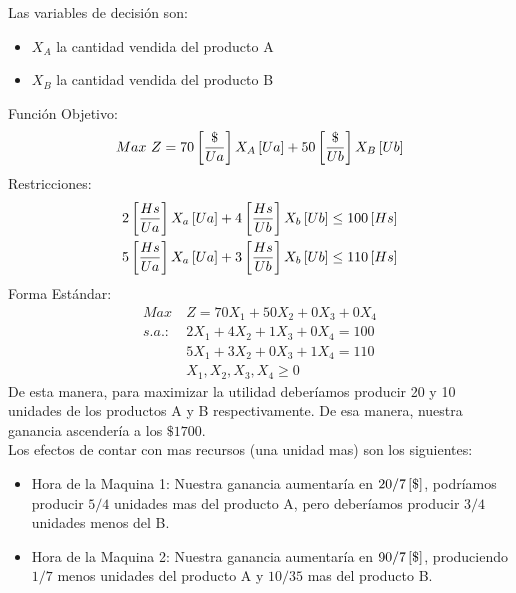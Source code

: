 \documentclass{tarea}
\begin{document}
\begin{homeworkProblem}[-1][Compañía]
Las variables de decisión son:
\begin{itemize}
	\item $X_A$ la cantidad vendida del producto A
	\item $X_B$ la cantidad vendida del producto B
\end{itemize}
Función Objetivo:
\begin{equation}
	Max\ Z = 70\left[ \frac{\$}{Ua} \right]X_A\left[ Ua \right] + 50\left[ \frac{\$}{Ub} \right]X_B\left[ Ub \right]
\end{equation}
Restricciones:
\begin{align*}
  2\left[ \frac{Hs}{Ua} \right]X_a\left[ Ua \right] + 4\left[ \frac{Hs}{Ub} \right]X_b\left[ Ub \right] \le 100 \left[ Hs \right] \\
  5\left[ \frac{Hs}{Ua} \right]X_a\left[ Ua \right] + 3\left[ \frac{Hs}{Ub} \right]X_b\left[ Ub \right] \le 110 \left[ Hs \right] \\  
\end{align*}
Forma Estándar:
\begin{align*}
	Max\ &Z = 70X_1 + 50X_2 + 0X_3 + 0X_4 \\
	s.a.: &2X_1 + 4X_2 + 1X_3 + 0X_4 = 100 \\
	&5X_1 + 3X_2 + 0X_3 + 1X_4 = 110 \\
	&X_1,X_2,X_3,X_4 \ge 0
\end{align*}
De esta manera, para maximizar la utilidad deberíamos producir 20 y 10 unidades de los productos A y B respectivamente.
De esa manera, nuestra ganancia ascendería a los $\$1700$.\\
Los efectos de contar con mas recursos (una unidad mas) son los siguientes:
\begin{itemize}
	\item Hora de la Maquina 1: Nuestra ganancia aumentaría en $20/7\left[ \$ \right]$, 
	podríamos producir $5/4$ unidades mas del producto A, pero deberíamos producir $3/4$ unidades menos del B.
	\item Hora de la Maquina 2: Nuestra ganancia aumentaría en $90/7\left[ \$ \right]$, produciendo $1/7$ menos unidades del producto A y $10/35$ mas del producto B. 
\end{itemize}

\end{homeworkProblem}
\end{document}
